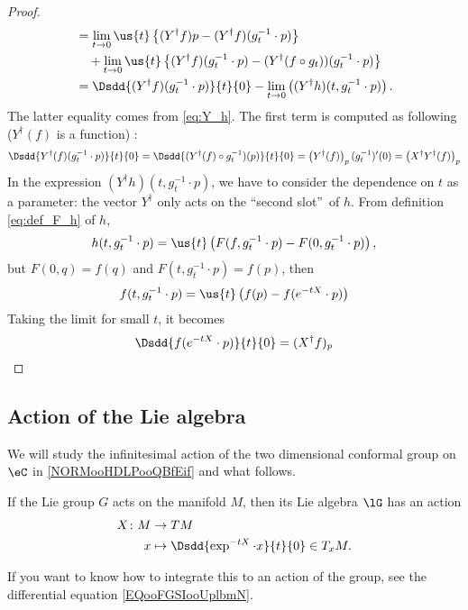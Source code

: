 \begin{proof}
\begin{equation}
\begin{aligned}
                     &=\lim_{t\to 0}\us{t}\left\{ (Y^{\dag} f)p-(Y^{\dag} f)(g_t^{-1}\cdot p) \right\}\\
		     &\quad+\lim_{t\to 0}\us{t}\left\{ (Y^{\dag} f)(g_t^{-1}\cdot p)
		                                      -(Y^{\dag}(f\circ g_t) )(g_t^{-1}\cdot p)
					       \right\}\\
   &=\Dsdd{ (Y^{\dag} f)(g_t^{-1}\cdot p) }{t}{0}-\lim_{t\to 0} 
                \left(    (Y^{\dag} h)(t,g_t^{-1}\cdot p)       \right).
\end{aligned}
\end{equation}
The latter equality comes from  \eqref{eq:Y_h}. The first term is computed as following ($Y^{\dag}(f)$ is a function) :
\begin{equation}
\Dsdd{ Y^{\dag}(f)(g_t^{-1}\cdot p) }{t}{0}=\Dsdd{ (Y^{\dag}(f)\circ g_t^{-1})(p) }{t}{0}
                                        =\left( Y^{\dag}(f) \right)_p(g_t^{-1})'(0)
					=\left( X^{\dag} Y^{\dag}(f)\right)_p
\end{equation}
In the expression $(Y^{\dag} h)(t,g_t^{-1}\cdot p)$, we have to consider the dependence on $t$ as a parameter: the vector $Y^{\dag}$ only acts on the ``second slot''\ of $h$. From definition \eqref{eq:def_F_h} of $h$,
\[
   h(t,g_t^{-1}\cdot p)=\us{t}\left(  F(f,g_t^{-1}\cdot p)-F(0,g_t^{-1}\cdot p)  
                             \right),
\]
but $F(0,q)=f(q)$ and $F(t,g_t^{-1}\cdot p)=f(p)$, then
\[
  f(t,g_t^{-1}\cdot p)=\us{t}\left( f(p)-f(e^{-tX}\cdot p) \right)
\]
Taking the limit for small $t$, it becomes 
\[
  \Dsdd{f(e^{-tX}\cdot p)}{t}{0}=(X^{\dag} f)_p
\]

\end{proof}

\subsection{Action of the Lie algebra}

\begin{normaltext}
    We will study the infinitesimal action of the two dimensional conformal group on $\eC$ in \ref{NORMooHDLPooQBfEif} and what follows.
\end{normaltext}

\begin{definition}       \label{DEFooUYOZooWdcClz}
    If the Lie group \( G\) acts on the manifold \( M\), then its Lie algebra \( \lG\) has an action
    \begin{equation}
        \begin{aligned}
            X\colon M&\to TM \\
            x&\mapsto \Dsdd{  \exp^{-tX}\cdot x }{t}{0}\in T_xM.
        \end{aligned}
    \end{equation}
\end{definition}
If you want to know how to integrate this to an action of the group, see the differential equation \eqref{EQooFGSIooUplbmN}.

